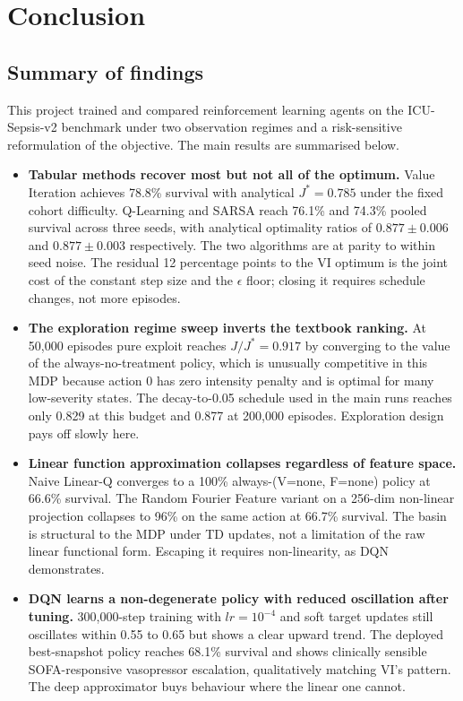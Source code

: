 \section{Conclusion}
\label{sec:conclusion}

\subsection{Summary of findings}

This project trained and compared reinforcement learning agents on the ICU-Sepsis-v2 benchmark under two observation regimes and a risk-sensitive reformulation of the objective. The main results are summarised below.

\begin{itemize}
    \item \textbf{Tabular methods recover most but not all of the optimum.} Value Iteration achieves 78.8\% survival with analytical $J^* = 0.785$ under the fixed cohort difficulty. Q-Learning and SARSA reach 76.1\% and 74.3\% pooled survival across three seeds, with analytical optimality ratios of $0.877 \pm 0.006$ and $0.877 \pm 0.003$ respectively. The two algorithms are at parity to within seed noise. The residual 12 percentage points to the VI optimum is the joint cost of the constant step size and the $\epsilon$ floor; closing it requires schedule changes, not more episodes.
    \item \textbf{The exploration regime sweep inverts the textbook ranking.} At 50{,}000 episodes pure exploit reaches $J/J^* = 0.917$ by converging to the value of the always-no-treatment policy, which is unusually competitive in this MDP because action 0 has zero intensity penalty and is optimal for many low-severity states. The decay-to-0.05 schedule used in the main runs reaches only 0.829 at this budget and 0.877 at 200{,}000 episodes. Exploration design pays off slowly here.
    \item \textbf{Linear function approximation collapses regardless of feature space.} Naive Linear-Q converges to a 100\% always-(V=none, F=none) policy at 66.6\% survival. The Random Fourier Feature variant on a 256-dim non-linear projection collapses to 96\% on the same action at 66.7\% survival. The basin is structural to the MDP under TD updates, not a limitation of the raw linear functional form. Escaping it requires non-linearity, as DQN demonstrates.
    \item \textbf{DQN learns a non-degenerate policy with reduced oscillation after tuning.} 300{,}000-step training with $lr = 10^{-4}$ and soft target updates still oscillates within 0.55 to 0.65 but shows a clear upward trend. The deployed best-snapshot policy reaches 68.1\% survival and shows clinically sensible SOFA-responsive vasopressor escalation, qualitatively matching VI's pattern. The deep approximator buys behaviour where the linear one cannot.

\end{itemize}
